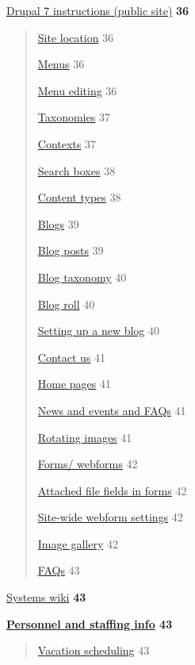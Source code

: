 \documentclass[
  openany]{book}
\begin{document}
\protect\hyperlink{drupal-7-instructions-public-site}{Drupal 7 instructions (public
site)} \textbf{36}

\begin{quote}
\protect\hyperlink{site-location}{Site location} 36

\protect\hyperlink{menus}{Menus} 36

\protect\hyperlink{menu-editing}{Menu editing} 36

\protect\hyperlink{taxonomies}{Taxonomies} 37

\protect\hyperlink{contexts}{Contexts} 37

\protect\hyperlink{search-boxes}{Search boxes} 38

\protect\hyperlink{content-types-1}{Content types} 38

\protect\hyperlink{blogs}{Blogs} 39

\protect\hyperlink{blog-posts}{Blog posts} 39

\protect\hyperlink{blog-taxonomy}{Blog taxonomy} 40

\protect\hyperlink{blog-roll}{Blog roll} 40

\protect\hyperlink{setting-up-a-new-blog}{Setting up a new blog} 40

\protect\hyperlink{contact-us}{Contact us} 41

\protect\hyperlink{home-pages}{Home pages} 41

\protect\hyperlink{news-and-events-and-faqs}{News and events and FAQs} 41

\protect\hyperlink{rotating-images}{Rotating images} 41

\protect\hyperlink{forms-webforms}{Forms/ webforms} 42

\protect\hyperlink{attached-file-fields-in-forms}{Attached file fields in forms} 42

\protect\hyperlink{site-wide-webform-settings}{Site-wide webform settings} 42

\protect\hyperlink{image-gallery}{Image gallery} 42

\protect\hyperlink{faqs}{FAQs} 43
\end{quote}

\protect\hyperlink{systems-wiki}{Systems wiki} \textbf{43}

\textbf{\protect\hyperlink{personnel-and-staffing-info}{Personnel and staffing info} 43}

\begin{quote}
\protect\hyperlink{vacation-scheduling}{Vacation scheduling} 43
\end{quote}
\end{document}

